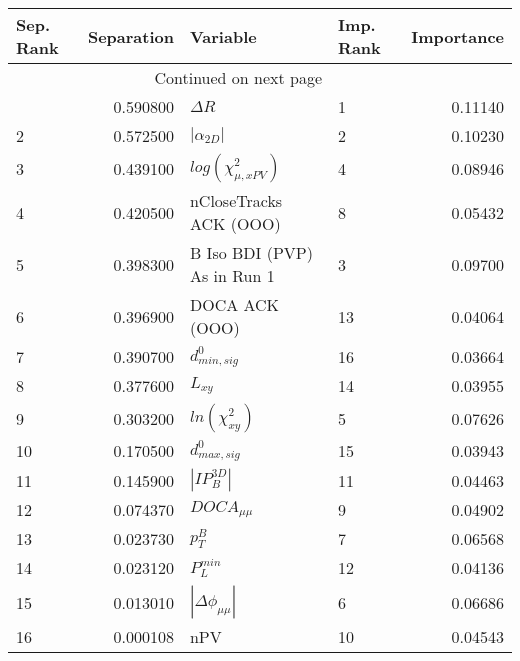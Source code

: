 \usepackage{lscape}

\begin{landscape}
\begin{longtable}{lrllr}
\toprule
Sep. Rank &  Separation &                     Variable & Imp. Rank &  Importance \\
\midrule
\endhead
\midrule
\multicolumn{3}{r}{{Continued on next page}} \\
\midrule
\endfoot

\bottomrule
\endlastfoot
        1 &    0.590800 &                   $\Delta R$ &         1 &     0.11140 \\
        2 &    0.572500 &              $|\alpha_{2D}|$ &         2 &     0.10230 \\
        3 &    0.439100 &    $log(\chi^{2}_{\mu,xPV})$ &         4 &     0.08946 \\
        4 &    0.420500 &       nCloseTracks ACK (OOO) &         8 &     0.05432 \\
        5 &    0.398300 &  B Iso BDI (PVP) As in Run 1 &         3 &     0.09700 \\
        6 &    0.396900 &               DOCA ACK (OOO) &        13 &     0.04064 \\
        7 &    0.390700 &             $d^0_{min, sig}$ &        16 &     0.03664 \\
        8 &    0.377600 &                     $L_{xy}$ &        14 &     0.03955 \\
        9 &    0.303200 &          $ln(\chi^{2}_{xy})$ &         5 &     0.07626 \\
       10 &    0.170500 &             $d^0_{max, sig}$ &        15 &     0.03943 \\
       11 &    0.145900 &              $|IP_{B}^{3D}|$ &        11 &     0.04463 \\
       12 &    0.074370 &              $DOCA_{\mu\mu}$ &         9 &     0.04902 \\
       13 &    0.023730 &                    $p^B_{T}$ &         7 &     0.06568 \\
       14 &    0.023120 &                $P^{min}_{L}$ &        12 &     0.04136 \\
       15 &    0.013010 &     $|\Delta \phi_{\mu\mu}|$ &         6 &     0.06686 \\
       16 &    0.000108 &                          nPV &        10 &     0.04543 \\
\end{longtable}

\end{landscape}
